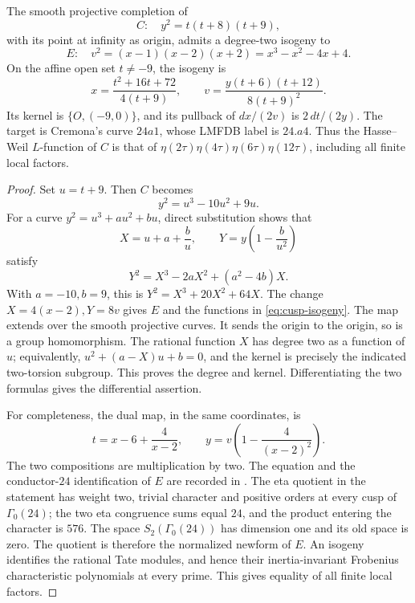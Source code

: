 \begin{theorem}\label{thm:cusp-isogeny}
The smooth projective completion of
\[
 C:\quad y^2=t(t+8)(t+9),
\]
with its point at infinity as origin, admits a degree-two isogeny to
\[
 E:\quad v^2=(x-1)(x-2)(x+2)=x^3-x^2-4x+4.
\]
On the affine open set \(t\ne-9\), the isogeny is
\begin{equation}\label{eq:cusp-isogeny}
 x=\frac{t^2+16t+72}{4(t+9)},\qquad
 v=\frac{y(t+6)(t+12)}{8(t+9)^2}.
\end{equation}
Its kernel is \(\{O,(-9,0)\}\), and its pullback of \(dx/(2v)\)
is \(2\,dt/(2y)\). The target is Cremona's curve \(24a1\),
whose LMFDB label is \(24.a4\). Thus the Hasse--Weil \(L\)-function
of \(C\) is that of \(\eta(2\tau)\eta(4\tau)\eta(6\tau)\eta(12\tau)\),
including all finite local factors.
\end{theorem}
\begin{proof}
Set \(u=t+9\). Then \(C\) becomes
\[
 y^2=u^3-10u^2+9u.
\]
For a curve \(y^2=u^3+au^2+bu\), direct substitution shows that
\[
 X=u+a+\frac bu,\qquad Y=y\left(1-\frac b{u^2}\right)
\]
satisfy
\[
 Y^2=X^3-2aX^2+(a^2-4b)X.
\]
With \(a=-10,b=9\), this is \(Y^2=X^3+20X^2+64X\).
The change \(X=4(x-2),Y=8v\) gives \(E\) and
the functions in \eqref{eq:cusp-isogeny}.
The map extends over the smooth projective curves. It sends the origin
to the origin, so is a group homomorphism. The rational function \(X\)
has degree two as a function of \(u\); equivalently,
\(u^2+(a-X)u+b=0\), and the kernel is precisely the indicated
two-torsion subgroup. This proves the degree and kernel.
Differentiating the two formulas gives the differential assertion.

For completeness, the dual map, in the same coordinates, is
\[
 t=x-6+\frac4{x-2},\qquad
 y=v\left(1-\frac4{(x-2)^2}\right).
\]
The two compositions are multiplication by two.
The equation and the conductor-\(24\) identification of \(E\)
are recorded in \cite{LMFDB24}. The eta quotient in the statement
has weight two, trivial character and positive orders at every
cusp of \(\Gamma_0(24)\); the two eta congruence sums equal \(24\),
and the product entering the character is \(576\).
The space \(S_2(\Gamma_0(24))\) has dimension one and its old space
is zero. The quotient is therefore the normalized newform of \(E\).
An isogeny identifies the rational Tate modules, and hence their
inertia-invariant Frobenius characteristic polynomials at every prime.
This gives equality of all finite local factors.
\end{proof}

